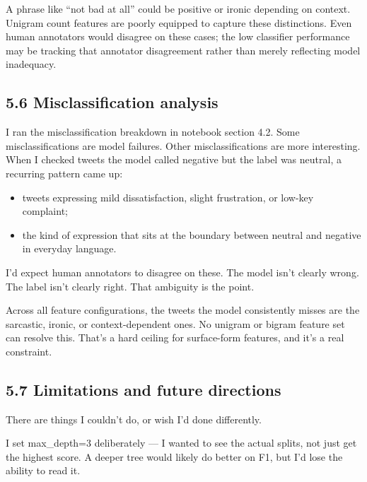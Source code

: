 \documentclass[12pt]{article}
\begin{document}
A phrase like ``not bad at all'' could be positive or ironic depending on context. Unigram count features are poorly equipped to capture these distinctions. Even human annotators would disagree on these cases; the low classifier performance may be tracking that annotator disagreement rather than merely reflecting model inadequacy.



\subsection*{5.6 Misclassification analysis}



I ran the misclassification breakdown in notebook section 4.2.
Some misclassifications are model failures.
Other misclassifications are more interesting. When I checked tweets the model called negative but the label was neutral, a recurring pattern came up:

\begin{itemize}

  \item tweets expressing mild dissatisfaction, slight frustration, or low-key complaint;

  \item the kind of expression that sits at the boundary between neutral and negative in everyday language.

\end{itemize} I'd expect human annotators to disagree on these. The model isn't clearly wrong. The label isn't clearly right. That ambiguity is the point.

Across all feature configurations, the tweets the model consistently misses are the sarcastic, ironic, or context-dependent ones. No unigram or bigram feature set can resolve this. That's a hard ceiling for surface-form features, and it's a real constraint.



\subsection*{5.7 Limitations and future directions}



There are things I couldn't do, or wish I'd done differently.

I set max\_depth=3 deliberately --- I wanted to see the actual splits, not just get the highest score.
A deeper tree would likely do better on F1, but I'd lose the ability to read it.
\end{document}
